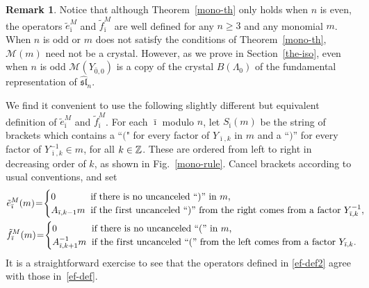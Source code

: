 \documentclass[11pt]{article}
\theoremstyle{definition}
\newtheorem{Remark}[Theorem]{Remark}
\newcommand{\bz}{\Bbb{Z}}
\newcommand{\asl}{\widehat{\mathfrak{{sl}}}}
\begin{document}
\begin{Remark}
Notice that although Theorem~\ref{mono-th} only holds when $n$ is even, the operators $\tilde e_{\bar \imath}^M$ and $\tilde f_{\bar \imath}^M$ are well def\/ined for any $n \geq 3$ and any monomial $m$. When $n$ is odd or $m$ does not satisfy the conditions of Theorem~\ref{mono-th}, $\mathcal{M}(m)$ need not be a crystal. However, as we prove in Section~\ref{the-iso}, even when $n$ is odd $\mathcal{M}(Y_{\bar 0, 0})$ is a copy of the crystal $B(\Lambda_0)$ of the fundamental representation of $\asl_n$.
\end{Remark}

We f\/ind it convenient to use the following slightly dif\/ferent but equivalent def\/inition of $\tilde e_{\bar \imath}^M$ and $\tilde f_{\bar \imath}^M$.
For each $\bar \imath$ modulo $n$, let $S_{\bar \imath}(m)$ be the string of brackets which contains a ``$($" for every factor of $Y_{\bar \imath, k}$ in $m$ and a ``$)$'' for every factor of $Y_{\bar \imath, k}^{-1} \in m$, for all $k \in \bz$. These are ordered from left to right in decreasing order of $k$, as shown in Fig.~\ref{mono-rule}. Cancel brackets according to usual conventions, and set
\begin{gather} \label{ef-def2}
\begin{split}
  & \tilde{e}^M_{\bar \imath}(m)  \hspace{-0.07cm} = \hspace{-0.07cm}
  \begin{cases}
    0 & \mbox{} \hspace{-0.15cm}  \text{if there is no uncanceled ``)'' in $m$},
    \\
   A_{\bar \imath,k-1}m & \mbox{} \hspace{-0.15cm}  \text{if the f\/irst  uncanceled ``)'' from the right comes from a factor $Y_{\bar \imath, k}^{-1}$},
  \end{cases}
\\
  & \tilde{f}^M_{\bar \imath}(m)  \hspace{-0.07cm} = \hspace{-0.07cm}
  \begin{cases}
    0 &  \mbox{} \hspace{-0.15cm}  \text{if there is no uncanceled ``('' in $m$},
    \\
   A_{\bar \imath, k+1}^{-1}m & \mbox{} \hspace{-0.15cm}  \text{if the f\/irst uncanceled ``('' from the left comes from a factor $Y_{\bar \imath, k}$}.
  \end{cases}
\end{split}\!\!\!\!\!\!\!
\end{gather}
It is a straightforward exercise to see that the operators def\/ined in \eqref{ef-def2} agree with those in~\eqref{ef-def}.
\end{document}

